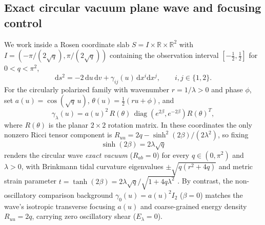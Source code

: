 \documentclass[11pt,a4paper]{article}
\newcommand{\dd}{\mathrm d}
\begin{document}
\subsection{Exact circular vacuum plane wave and focusing control}
We work inside a Rosen coordinate slab $S = I \times \mathbb{R} \times
\mathbb{R}^2$ with $I = (-\pi/(2\sqrt{q}), \pi/(2\sqrt{q}))$ containing the
observation interval $[-\tfrac12, \tfrac12]$ for $0 < q < \pi^2$,
\begin{equation}
 \dd s^2 = -2\,\dd u\,\dd v + \gamma_{ij}(u)\,\dd x^i \dd x^j,
 \qquad i,j \in \{1,2\}.
 \label{eq:rosen}
\end{equation}
For the circularly polarized family with wavenumber $r = 1/\lambda > 0$ and
phase $\phi$, set $a(u) = \cos(\sqrt{q}\,u)$, $\theta(u) = \tfrac12(r u + \phi)$,
and
\begin{equation}
 \gamma_\lambda(u) = a(u)^2\,R(\theta)\,\operatorname{diag}\!\left(e^{2\beta},
 e^{-2\beta}\right) R(\theta)^T,
 \label{eq:circular}
\end{equation}
where $R(\theta)$ is the planar $2\times 2$ rotation matrix. In these
coordinates the only nonzero Ricci tensor component is
$R_{uu} = 2q - \sinh^2(2\beta)/(2\lambda^2)$, so fixing
\begin{equation}
 \sinh(2\beta) = 2\lambda\sqrt{q}
 \label{eq:vacuum}
\end{equation}
renders the circular wave \emph{exact vacuum} ($R_{ab} = 0$) for every
$q \in (0,\pi^2)$ and $\lambda > 0$, with Brinkmann tidal curvature
eigenvalues $\pm \sqrt{q(r^2 + 4q)}$ and metric strain parameter $t = \tanh(2\beta)
= 2\lambda\sqrt{q}/\sqrt{1+4q\lambda^2}$ \cite{wavecausal}. By contrast, the
non-oscillatory comparison background $\gamma_0(u) = a(u)^2 I_2$ ($\beta = 0$)
matches the wave's isotropic transverse focusing $a(u)$ and coarse-grained energy
density $R_{uu} = 2q$, carrying zero oscillatory shear ($E_\lambda = 0$).
\end{document}
